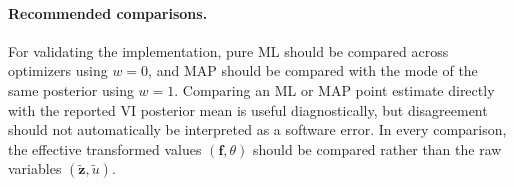 \paragraph{Recommended comparisons.}
For validating the implementation, pure ML should be compared across optimizers
using $w=0$, and MAP should be compared with the mode of the same posterior using
$w=1$. Comparing an ML or MAP point estimate directly with the reported VI posterior
mean is useful diagnostically, but disagreement should not automatically be interpreted
as a software error. In every comparison, the effective transformed values
$(\bm f,\theta)$ should be compared rather than the raw variables
$(\widetilde{\bm z},\widetilde u)$.

